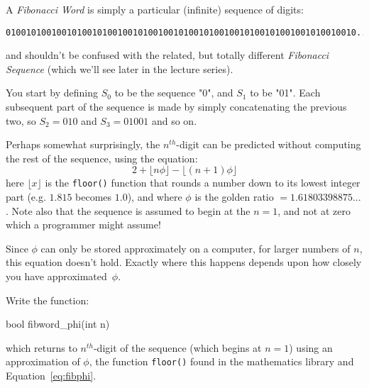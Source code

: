 \label{sec:fibword_phi}



A {\em Fibonacci Word} is simply a particular (infinite) sequence of digits:
\begin{verbatim}
010010100100101001010010010100100101001010010010100101001001010010010...
\end{verbatim}
and shouldn't be confused with the related, but totally different {\em Fibonacci Sequence} (which we'll see later in the lecture series).

You start by defining $S_0$ to be the sequence "0", and $S_1$ to be 
"01". Each subsequent part of the sequence is made by simply concatenating
the previous two, so $S_2 = 010$ and $S_3 = 01001$ and so on.

Perhaps somewhat surprisingly, the $n^{th}$-digit can be
predicted without computing the rest of the sequence, using the equation:
\begin{equation}
\label{eq:fibphi}
2 + \lfloor n \phi \rfloor - \lfloor (n+1) \phi \rfloor
\end{equation}
here $\lfloor x \rfloor$ is the \verb^floor()^ function that
rounds a number down to its lowest integer part (e.g. $1.815$ becomes
$1.0$), and where $\phi$ is the golden ratio $=1.61803398875...$.
Note also that the sequence is assumed to begin at the $n=1$, and not 
at zero which a programmer might assume!

Since $\phi$ can only be stored approximately on a computer,
for larger numbers of $n$, this equation doesn't hold. Exactly
where this happens depends upon how closely you have approximated~$\phi$.

\begin{exercise}
\label{ex:fibword_phi}
Write the function:
\begin{codesnippet}
bool fibword_phi(int n)
\end{codesnippet}
which returns to $n^{th}$-digit of the sequence (which begins at $n=1$)
using an approximation of $\phi$, the function \verb^floor()^ found in 
the mathematics library and Equation~\ref{eq:fibphi}.
\end{exercise}
